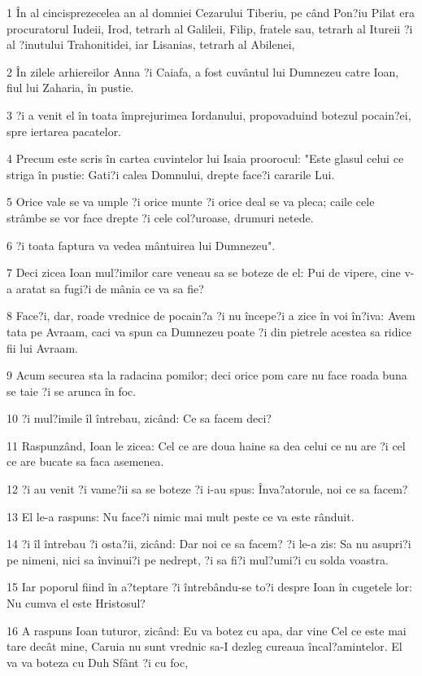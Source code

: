 \par 1 În al cincisprezecelea an al domniei Cezarului Tiberiu, pe când Pon?iu Pilat era procuratorul Iudeii, Irod, tetrarh al Galileii, Filip, fratele sau, tetrarh al Itureii ?i al ?inutului Trahonitidei, iar Lisanias, tetrarh al Abilenei,
\par 2 În zilele arhiereilor Anna ?i Caiafa, a fost cuvântul lui Dumnezeu catre Ioan, fiul lui Zaharia, în pustie.
\par 3 ?i a venit el în toata împrejurimea Iordanului, propovaduind botezul pocain?ei, spre iertarea pacatelor.
\par 4 Precum este scris în cartea cuvintelor lui Isaia proorocul: "Este glasul celui ce striga în pustie: Gati?i calea Domnului, drepte face?i cararile Lui.
\par 5 Orice vale se va umple ?i orice munte ?i orice deal se va pleca; caile cele strâmbe se vor face drepte ?i cele col?uroase, drumuri netede.
\par 6 ?i toata faptura va vedea mântuirea lui Dumnezeu".
\par 7 Deci zicea Ioan mul?imilor care veneau sa se boteze de el: Pui de vipere, cine v-a aratat sa fugi?i de mânia ce va sa fie?
\par 8 Face?i, dar, roade vrednice de pocain?a ?i nu începe?i a zice în voi în?iva: Avem tata pe Avraam, caci va spun ca Dumnezeu poate ?i din pietrele acestea sa ridice fii lui Avraam.
\par 9 Acum securea sta la radacina pomilor; deci orice pom care nu face roada buna se taie ?i se arunca în foc.
\par 10 ?i mul?imile îl întrebau, zicând: Ce sa facem deci?
\par 11 Raspunzând, Ioan le zicea: Cel ce are doua haine sa dea celui ce nu are ?i cel ce are bucate sa faca asemenea.
\par 12 ?i au venit ?i vame?ii sa se boteze ?i i-au spus: Înva?atorule, noi ce sa facem?
\par 13 El le-a raspuns: Nu face?i nimic mai mult peste ce va este rânduit.
\par 14 ?i îl întrebau ?i osta?ii, zicând: Dar noi ce sa facem? ?i le-a zis: Sa nu asupri?i pe nimeni, nici sa învinui?i pe nedrept, ?i sa fi?i mul?umi?i cu solda voastra.
\par 15 Iar poporul fiind în a?teptare ?i întrebându-se to?i despre Ioan în cugetele lor: Nu cumva el este Hristosul?
\par 16 A raspuns Ioan tuturor, zicând: Eu va botez cu apa, dar vine Cel ce este mai tare decât mine, Caruia nu sunt vrednic sa-I dezleg cureaua încal?amintelor. El va va boteza cu Duh Sfânt ?i cu foc,
